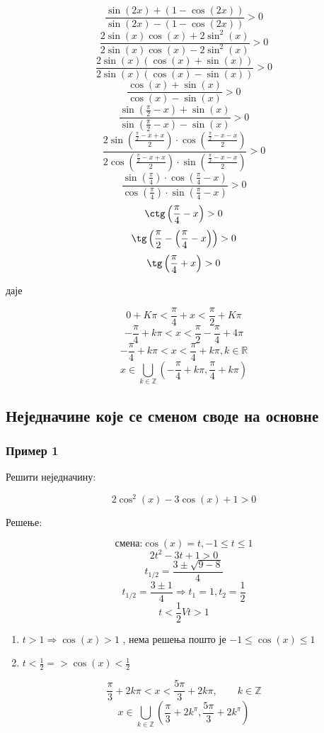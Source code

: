 \documentclass[a4paper,12pt]{article}
\begin{document}
\[\frac{\sin(2x)+(1-\cos(2x))}{\sin(2x)-(1-\cos(2x))}>0\]
\[\frac{2\sin(x)\cos(x)+2\sin^{2}(x)}{2\sin(x)\cos(x)-2\sin^{2}(x)}>0\]
\[\frac{2\sin(x)(\cos(x)+\sin(x))}{2\sin(x)(\cos(x)-\sin(x))}>0\]
\[\frac{\cos(x)+\sin(x)}{\cos(x)-\sin(x)}>0\]
\[\frac{\sin\left(\frac{\pi}{2}-x\right)+\sin(x)}{\sin\left(\frac{\pi}{2}-x\right)-\sin(x)}>0\]
\[\frac{2\sin\left(\frac{\frac{\pi}{2}-x+x}{2}\right)\cdot\cos\left(\frac{\frac{\pi}{2}-x-x}{2}\right)}{2\cos\left(\frac{\frac{\pi}{2}-x+x}{2}\right)\cdot\sin\left(\frac{\frac{\pi}{2}-x-x}{2}\right)}>0\]
\[\frac{\sin\left(\frac{\pi}{4}\right)\cdot\cos\left(\frac{\pi}{4}-x\right)}{\cos\left(\frac{\pi}{4}\right)\cdot\sin\left(\frac{\pi}{4}-x\right)}>0\]
\[\ctg\left(\frac{\pi}{4}-x\right)>0\]
\[\tg\left(\frac{\pi}{2}-\left(\frac{\pi}{4}-x\right)\right)>0\]
\[\tg\left(\frac{\pi}{4}+x\right)>0\]
\centerline{даје}
\[0+K\pi<\frac{\pi}{4}+x<\frac{\pi}{2}+K\pi\]
\[-\frac{\pi}{4}+k\pi<x<\frac{\pi}{2}-\frac{\pi}{4}+4\pi\]
\[-\frac{\pi}{4}+k\pi<x<\frac{\pi}{4}+k\pi,k\in\mathbb{R}\]
\[x\in\bigcup_{k\in\mathbb{Z}}\left(-\frac{\pi}{4}+k\pi,\frac{\pi}{4}+k\pi\right)\]


\subsection{Неједначине које се сменом своде на основне}

\subsubsection{Пример 1}

Решити неједначину:

\[2\cos^{2}(x)-3\cos(x)+1>0\]


Решење:

\[\text{смена:}\cos(x)=t,-1\leqslant t\leqslant1\]
\[2t^{2}-3t+1>0\]
\[t_{1/2}=\frac{3\pm\sqrt{9-8}}{4}\]
\[t_{1/2}=\frac{3\pm1}{4}\Rightarrow t_{1}=1,t_{2}=\frac{1}{2}
\]
\[t<\frac{1}{2}Vt>1\]

\begin{enumerate}[label=\alph*)]
\item $t>1\Rightarrow\cos(x)>1$ , нема решења пошто је $-1\leqslant\cos(x)\leqslant1$
\item $t<\frac{1}{2}=>\cos(x)<\frac{1}{2}$
\end{enumerate}

\[\frac{\pi}{3}+2k\pi<x<\frac{5\pi}{3}+2k\pi,\qquad k\in\mathbb{Z}\]
\[x\in\bigcup_{k\in\mathbb{Z}}\left(\frac{\pi}{3}+2k^{\pi},\frac{5\pi}{3}+2k^{\pi}\right)\]
\end{document}
